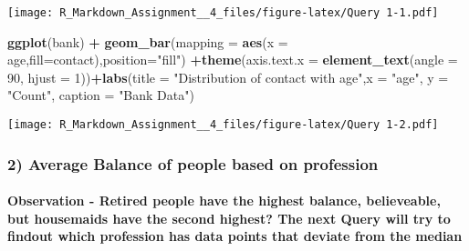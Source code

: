 \documentclass[]{article}
\newenvironment{Shaded}{\begin{snugshade}}{\end{snugshade}}
\newcommand{\KeywordTok}[1]{\textcolor[rgb]{0.13,0.29,0.53}{\textbf{#1}}}
\newcommand{\DataTypeTok}[1]{\textcolor[rgb]{0.13,0.29,0.53}{#1}}
\newcommand{\DecValTok}[1]{\textcolor[rgb]{0.00,0.00,0.81}{#1}}
\newcommand{\StringTok}[1]{\textcolor[rgb]{0.31,0.60,0.02}{#1}}
\newcommand{\OperatorTok}[1]{\textcolor[rgb]{0.81,0.36,0.00}{\textbf{#1}}}
\newcommand{\NormalTok}[1]{#1}
\let\oldparagraph\paragraph
\renewcommand{\paragraph}[1]{\oldparagraph{#1}\mbox{}}
\begin{document}
\texttt{[image: R\_Markdown\_Assignment\_\_4\_files/figure-latex/Query 1-1.pdf]}

\begin{Shaded}
\begin{Highlighting}[]
\KeywordTok{ggplot}\NormalTok{(bank) }\OperatorTok{+}
\KeywordTok{geom_bar}\NormalTok{(}\DataTypeTok{mapping =} \KeywordTok{aes}\NormalTok{(}\DataTypeTok{x =}\NormalTok{ age,}\DataTypeTok{fill=}\NormalTok{contact),}\DataTypeTok{position=}\StringTok{"fill"}\NormalTok{) }\OperatorTok{+}\KeywordTok{theme}\NormalTok{(}\DataTypeTok{axis.text.x =} \KeywordTok{element_text}\NormalTok{(}\DataTypeTok{angle =} \DecValTok{90}\NormalTok{, }\DataTypeTok{hjust =} \DecValTok{1}\NormalTok{))}\OperatorTok{+}\KeywordTok{labs}\NormalTok{(}\DataTypeTok{title =} \StringTok{"Distribution of contact with age"}\NormalTok{,}\DataTypeTok{x =} \StringTok{"age"}\NormalTok{, }\DataTypeTok{y =} \StringTok{"Count"}\NormalTok{,}
\DataTypeTok{caption =} \StringTok{"Bank Data"}\NormalTok{) }
\end{Highlighting}
\end{Shaded}

\texttt{[image: R\_Markdown\_Assignment\_\_4\_files/figure-latex/Query 1-2.pdf]}

\subsubsection{2) Average Balance of people based on
profession}\label{average-balance-of-people-based-on-profession}

\paragraph{Observation - Retired people have the highest balance,
believeable, but housemaids have the second highest? The next Query will
try to findout which profession has data points that deviate from the
median}\label{observation---retired-people-have-the-highest-balance-believeable-but-housemaids-have-the-second-highest-the-next-query-will-try-to-findout-which-profession-has-data-points-that-deviate-from-the-median}
\end{document}

